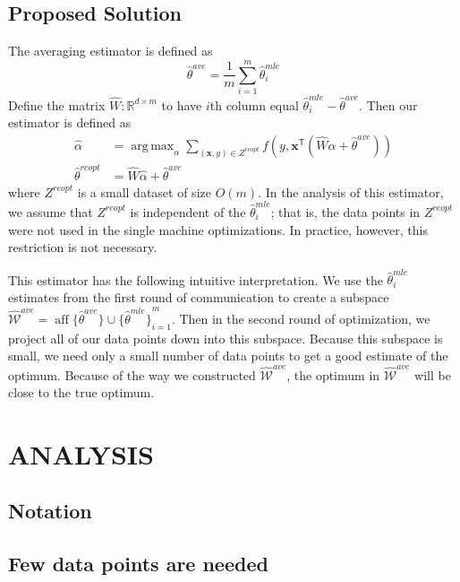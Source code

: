 \documentclass[twoside]{article}
\DeclareMathOperator*{\argmax}{arg\,max}
\DeclareMathOperator*{\affspan}{aff}
\newcommand{\Wave}{{\mathcal{\hat W}^{ave}}}
\newcommand{\x}{\mathbf{x}}
\newcommand{\w}{\theta}
\newcommand{\wreopt}{\hat\w^{reopt}}
\newcommand{\wave}{\hat\w^{ave}}
\newcommand{\wmle}{\hat\w^{mle}}
\newcommand{\wstar}{{\w^{*}}}
\newcommand{\trans}[1]{\ensuremath{{#1}^{\mathsf{T}}}}
\begin{document}
\subsection{Proposed Solution}

The averaging estimator is defined as
\begin{equation}
\wave = \frac{1}{m}\sum_{i=1}^m \wmle_i
\end{equation}
Define the matrix $\hat W : \mathbb{R}^{d\times m}$ to have $i$th column equal $\wmle_i-\wave$.
Then our estimator is defined as
\begin{equation}
\begin{aligned}
\hat\alpha &= \argmax_\alpha \sum _{(\x,y)\in Z^{reopt}} f\left(y,\trans\x (\hat W\alpha + \wave)\right)
\\
\wreopt &= \hat W \hat\alpha + \wave
\end{aligned}
\end{equation}
where $Z^{reopt}$ is a small dataset of size $O(m)$.
In the analysis of this estimator, we assume that $Z^{reopt}$ is independent of the $\wmle_i$;
that is, the data points in $Z^{reopt}$ were not used in the single machine optimizations.
In practice, however, this restriction is not necessary.

This estimator has the following intuitive interpretation.
We use the $\wmle_i$ estimates from the first round of communication to create a subspace $\Wave=\affspan\{\wave\}\cup{\{\wmle\}}_{i=1}^m$.
Then in the second round of optimization, we project all of our data points down into this subspace.
Because this subspace is small, we need only a small number of data points to get a good estimate of the optimum.
Because of the way we constructed $\Wave$,
the optimum in $\Wave$ will be close to the true optimum.

\newpage
\section{ANALYSIS}


\subsection{Notation}

\subsection{Few data points are needed}
\label{sec:vcdim}
\end{document}
